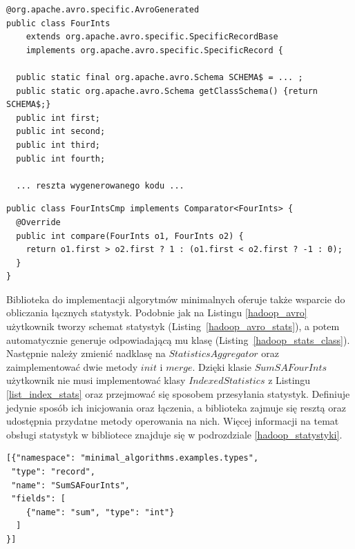\documentclass[magisterska]{pracamgr}
\begin{document}
\begin{lstlisting}[language=SmallJava,firstnumber=1,label=hadoop_input_class,caption=Wygenerowana klasa FourInts]
@org.apache.avro.specific.AvroGenerated
public class FourInts
    extends org.apache.avro.specific.SpecificRecordBase
    implements org.apache.avro.specific.SpecificRecord {
    
  public static final org.apache.avro.Schema SCHEMA$ = ... ;
  public static org.apache.avro.Schema getClassSchema() {return SCHEMA$;}
  public int first;
  public int second;
  public int third;
  public int fourth;
  
  ... reszta wygenerowanego kodu ...
\end{lstlisting}

\begin{lstlisting}[language=SmallJava,firstnumber=1,caption=Komparator obiektów wejściowych]
public class FourIntsCmp implements Comparator<FourInts> {
  @Override
  public int compare(FourInts o1, FourInts o2) {
    return o1.first > o2.first ? 1 : (o1.first < o2.first ? -1 : 0);
  }
}
\end{lstlisting}

Biblioteka do implementacji algorytmów minimalnych oferuje także wsparcie do obliczania łącznych statystyk. Podobnie jak na Listingu \ref{hadoop_avro} użytkownik tworzy schemat statystyk (\mbox{Listing \ref{hadoop_avro_stats}}), a potem automatycznie generuje odpowiadającą mu klasę (\mbox{Listing \ref{hadoop_stats_class}}). Następnie należy zmienić nadklasę na \(StatisticsAggregator\) oraz zaimplementować dwie metody \(init\) i \(merge\). Dzięki klasie \(SumSAFourInts\) użytkownik nie musi implementować klasy \(IndexedStatistics\) z Listingu \ref{list_index_stats} oraz przejmować się sposobem przesyłania statystyk. Definiuje jedynie sposób ich inicjowania oraz łączenia, a biblioteka zajmuje się resztą oraz udostępnia przydatne metody operowania na nich. Więcej informacji na temat obsługi statystyk w bibliotece znajduje się w podrozdziale \ref{hadoop_statystyki}.

\newpage
\begin{lstlisting}[language=SmallJava,firstnumber=1,label=hadoop_avro_stats,caption=Schemat AVRO statystyk na obiektach wejściowych]
[{"namespace": "minimal_algorithms.examples.types",
 "type": "record",
 "name": "SumSAFourInts",
 "fields": [
    {"name": "sum", "type": "int"}
  ]
}]
\end{lstlisting}
\end{document}
